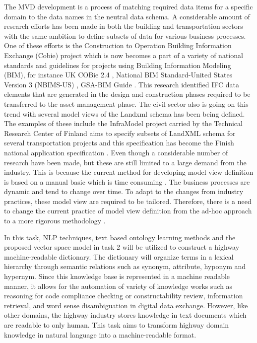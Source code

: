 \documentclass[Journal, InsideFigs, DoubleSpace]{ascelike} %
\begin{document}
The MVD development is a process of matching required data items for a specific domain to the data names in the neutral data schema. A considerable amount of research efforts has been made in both the building and transportation sectors with the same ambition to define subsets of data for various business processes. One of these efforts is the Construction to Operation Building Information Exchange (Cobie) project \cite{east07} which is now becomes a part of a variety of national standards and guidelines for projects using Building Information Modeling (BIM), for instance UK COBie 2.4 \cite{nisbet12}, National BIM Standard-United States Version 3 (NBIMS-US) \cite{nibs15}, GSA-BIM Guide \cite{gsa11}. This research identified IFC data elements that are generated in the design and construction phases required to be transferred to the asset management phase. The civil sector also is going on this trend with several model views of the Landxml schema has been being defined. The examples of these include the InfraModel project carried by the Technical Research Center of Finland aims to specify subsets of LandXML schema for several transportation projects and this specification has become the Finish national application specification \cite{inframodel14}. Even though a considerable number of research have been made, but these are still limited to a large demand from the industry. This is because the current method for developing model view definition is based on a manual basic which is time consuming \cite{venugopal12,eastman12,hu14}. The business processes are dynamic and tend to change over time. To adapt to the changes from industry practices, these model view are required to be tailored. Therefore, there is a need to change the current practice of model view definition from the ad-hoc approach to a more rigorous methodology \cite{venugopal12}. 
\par
In this task, NLP techniques, text based ontology learning methods and the proposed vector space model in task 2 will be utilized to construct a highway machine-readable dictionary. The dictionary will organize terms in a lexical hierarchy through semantic relations such as synonym, attribute, hyponym and hypernym. Since this knowledge base is represented in a machine readable manner, it allows for the automation of variety of knowledge works such as reasoning for code compliance checking or constructability review, information retrieval, and word sense disambiguation in digital data exchange. However, like other domains, the highway industry stores knowledge in text documents which are readable to only human. This task aims to transform highway domain knowledge in natural language into a machine-readable format.
\end{document}
